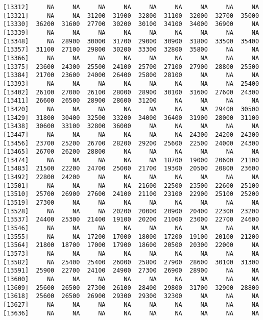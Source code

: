 \documentclass[]{article}
\begin{document}
\begin{verbatim}
[13312]     NA     NA     NA     NA     NA     NA     NA     NA     NA
[13321]     NA     NA  31200  31900  32800  31100  32000  32700  35000
[13330]  36200  31600  27700  30200  30100  34100  34000  36900     NA
[13339]     NA     NA     NA     NA     NA     NA     NA     NA     NA
[13348]     NA  28900  30000  31700  29000  30900  31800  33500  35400
[13357]  31100  27100  29800  30200  33300  32800  35800     NA     NA
[13366]     NA     NA     NA     NA     NA     NA     NA     NA     NA
[13375]  23600  24300  25500  24100  25700  27100  27900  28800  25500
[13384]  21700  23600  24000  26400  25800  28100     NA     NA     NA
[13393]     NA     NA     NA     NA     NA     NA     NA     NA  25400
[13402]  26100  27000  26100  28000  28900  30100  31600  27600  24300
[13411]  26600  26500  28900  28600  31200     NA     NA     NA     NA
[13420]     NA     NA     NA     NA     NA     NA     NA  29400  30500
[13429]  31800  30400  32500  33200  34000  36400  31900  28000  31100
[13438]  30600  33100  32800  36000     NA     NA     NA     NA     NA
[13447]     NA     NA     NA     NA     NA     NA  24300  24200  24300
[13456]  23700  25200  26700  28200  29200  25600  22500  24000  24300
[13465]  26700  26200  28800     NA     NA     NA     NA     NA     NA
[13474]     NA     NA     NA     NA     NA  18700  19000  20600  21100
[13483]  21500  22200  24700  25000  21700  19300  20500  20800  23600
[13492]  22800  24200     NA     NA     NA     NA     NA     NA     NA
[13501]     NA     NA     NA     NA  21600  22500  23500  22600  25100
[13510]  25700  26900  27600  24100  21100  23100  22900  25100  25200
[13519]  27300     NA     NA     NA     NA     NA     NA     NA     NA
[13528]     NA     NA     NA  20200  20000  20900  20400  22300  23200
[13537]  24400  25300  21400  19100  20200  21000  23000  22700  24600
[13546]     NA     NA     NA     NA     NA     NA     NA     NA     NA
[13555]     NA     NA  17200  17000  18000  17200  19100  20100  21200
[13564]  21800  18700  17000  17900  18600  20500  20300  22000     NA
[13573]     NA     NA     NA     NA     NA     NA     NA     NA     NA
[13582]     NA  25400  25400  26000  25800  27900  28600  30100  31300
[13591]  25900  22700  24100  24900  27300  26900  28900     NA     NA
[13600]     NA     NA     NA     NA     NA     NA     NA     NA     NA
[13609]  25600  26500  27300  26100  28400  29800  31700  32900  28800
[13618]  25600  26500  26900  29300  29300  32300     NA     NA     NA
[13627]     NA     NA     NA     NA     NA     NA     NA     NA     NA
[13636]     NA     NA     NA     NA     NA     NA     NA     NA     NA

\end{verbatim}
\end{document}
